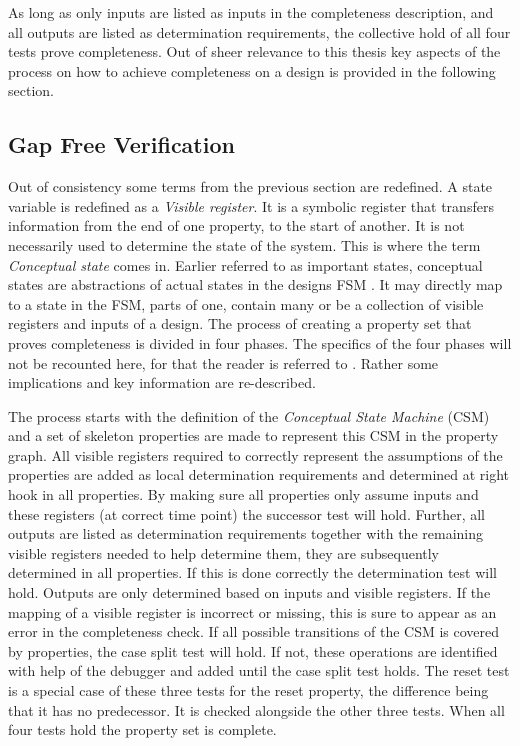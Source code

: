 As long as only inputs are listed as inputs in the completeness description, and all outputs are listed as determination requirements, the collective hold of all four tests prove completeness. Out of sheer relevance to this thesis key aspects of the process on how to achieve completeness on a design is provided in the following section. 

\subsection{Gap Free Verification}
\label{sub:gfv}
Out of consistency some terms from the previous section are redefined. A state variable is redefined as a \textit{Visible register}. It is a symbolic register that transfers information from the end of one property, to the start of another. It is not necessarily used to determine the state of the system. This is where the term \textit{Conceptual state} comes in. Earlier referred to as important states, conceptual states are abstractions of actual states in the designs FSM . It may directly map to a state in the FSM, parts of one,  contain many or be a collection of visible registers and inputs of a design. The process of creating a property set that proves completeness is divided in four phases. The specifics of the four phases will not be recounted here, for that the reader is referred to \cite{gapfree}. Rather some implications and key information are re-described. \par
The process starts with the definition of the \textit{Conceptual State Machine} (CSM) and a set of skeleton properties are made to represent this CSM in the property graph. All visible registers required to correctly represent the assumptions of the properties are added as local determination requirements and determined at right hook in all properties. By making sure all properties only assume inputs and these registers (at correct time point) the successor test will hold. Further, all outputs are listed as determination requirements together with the remaining visible registers needed to help determine them, they are subsequently determined in all properties. If this is done correctly the determination test will hold. Outputs are only determined based on inputs and visible registers. If the mapping of a visible register is incorrect or missing, this is sure to appear as an error in the completeness check. If all possible transitions of the CSM is covered by properties, the case split test will hold. If not, these operations are identified with help of the debugger and added until the case split test holds. The reset test is a special case of these three tests for the reset property, the difference being that it has no predecessor. It is checked alongside the other three tests. When all four tests hold the property set is complete. 

